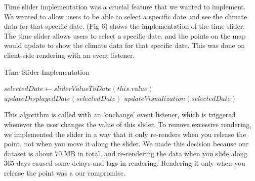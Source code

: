 \documentclass[10pt,twocolumn,twoside]{opticajnl}
\begin{document}
Time slider implementation was a crucial feature that we wanted to implement. We wanted to allow users to be able to select a specific date and see the climate data for that specific date. (Fig 6) shows the implementation of the time slider. The time slider allows users to select a specific date, and the points on the map would update to show the climate data for that specific date. This was done on client-side rendering with an event listener.

\begin{algorithm}
    \caption{Time Slider Implementation}
    \begin{algorithmic}[1]
    \State $selectedDate \gets sliderValueToDate(this.value)$
    \State $updateDisplayedDate(selectedDate)$
    \State $updateVisualization(selectedDate)$
    \EndProcedure
    \end{algorithmic}
\end{algorithm}

This algorithm is called with an 'onchange' event listener, which is triggered whenever the user changes the value of this slider. To remove excessive rendering, we implemented the slider in a way that it only re-renders when you release the point, not when you move it along the slider. We made this decision because our dataset is about 70 MB in total, and re-rendering the data when you slide along 365 days caused some delays and lags in rendering. Rendering it only when you release the point was a our compromise.
\end{document}
